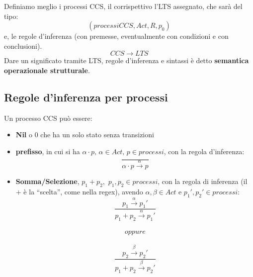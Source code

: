 Definiamo meglio i processi CCS, il corrispettivo l'LTS assegnato, che sarà
del tipo:
\[(processiCCS, Act, R, p_0)\]
e, le regole d'inferenza (con premesse, eventualmente con condizioni
e con conclusioni).\\
\[CCS\to LTS\]
Dare un significato tramite LTS, regole d'inferenza e sintassi è detto
\textbf{semantica operazionale strutturale}.\\
\subsection{Regole d'inferenza per processi}
Un processo CCS può essere:
\begin{itemize}
  \item \textbf{Nil} o $0$ che ha un solo stato senza transizioni
  \begin{center}
  \end{center}
  \item \textbf{prefisso}, in cui si ha $\alpha\cdot p,\,\alpha\in Act,\, p\in
  processi$, con la regola d'inferenza:
  \[\frac{}{\alpha\cdot p\stackrel{\alpha}{\rightarrow}p}\]
  \begin{center}
  \end{center}
  \item \textbf{Somma/Selezione}, $p_1+p_2,\,\, p_1, p_2\in processi$, con la regola di
  inferenza (il $+$ è la ``scelta'', come nella regex), avendo $\alpha,\beta\in
  Act$ e $p_1', p_2'\in processi$:
  \[\frac{p_1\stackrel{\alpha}{\rightarrow}p_1'}{p_1+p_2
      \stackrel{\alpha}{\rightarrow}p_1'}\] \\
  \[oppure\]\\
   \[\frac{p_2\stackrel{\beta}{\rightarrow}p_2'}{p_1+p_2
       \stackrel{\beta}{\rightarrow}p_2'}\]\\
   \begin{center}
\end{center}
\end{itemize}
